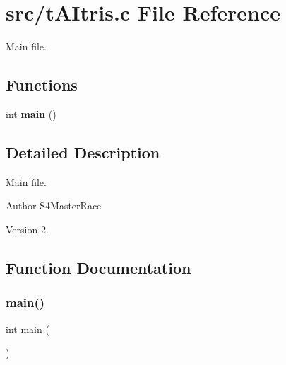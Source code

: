 \section{src/t\+A\+Itris.c File Reference}
\label{tAItris_8c}


Main file.  


\subsection*{Functions}
\begin{DoxyCompactItemize}
\item 
int \textbf{ main} ()
\end{DoxyCompactItemize}


\subsection{Detailed Description}
Main file. 

\begin{DoxyAuthor}{Author}
S4\+Master\+Race 
\end{DoxyAuthor}
\begin{DoxyVersion}{Version}
2. 
\end{DoxyVersion}


\subsection{Function Documentation}
\mbox{\label{tAItris_8c_ae66f6b31b5ad750f1fe042a706a4e3d4}} 
\subsubsection{main()}
{\footnotesize\ttfamily int main (\begin{DoxyParamCaption}{ }\end{DoxyParamCaption})}

